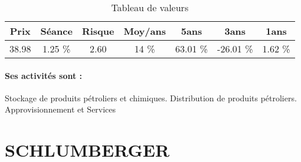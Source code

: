 \documentclass[11pt,a4paper]{report}%
\begin{document}
\begin{table}[H]
  \centering
    \begin{tabular}{|c|c|c|c|c|c|c|}
    \hline
    Prix & Séance & Risque  & Moy/ans & 5ans & 3ans & 1ans \\
    \hline
    38.98 &    1.25 \%    & 2.60 & 14 \% & 63.01 \% & -26.01 \% & 1.62 \% \\
    \hline
    \end{tabular}%
        \label{tab:table_RUBIS}%
      \caption{Tableau de valeurs}
\end{table}%

\paragraph{Ses activités sont : } Stockage de produits pétroliers et chimiques. Distribution de produits pétroliers. Approvisionnement et Services  
    
    \newpage

\section{SCHLUMBERGER}
\end{document}

